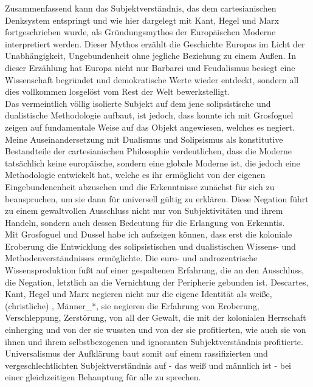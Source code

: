 Zusammenfassend kann das Subjektverständnis, das dem cartesianischen Denksystem
entspringt und wie hier dargelegt mit Kant, Hegel und Marx fortgeschrieben
wurde, als Gründungsmythos der Europäischen Moderne interpretiert werden. \footnotemark {} 
Dieser Mythos erzählt die Geschichte Europas im Licht der Unabhängigkeit,
Ungebundenheit ohne jegliche Beziehung zu einem Außen. In dieser Erzählung hat
Europa nicht nur Barbarei und Feudalismus besiegt eine Wissenschaft begründet
und demokratische Werte wieder entdeckt, sondern all dies vollkommen losgelöst
vom Rest der Welt bewerkstelligt.\footnotemark {}\\
 Das vermeintlich völlig isolierte Subjekt
auf dem jene solipsistische und dualistische Methodologie aufbaut, ist jedoch,
dass konnte ich mit Grosfoguel zeigen auf fundamentale Weise auf das Objekt
angewiesen, welches es negiert. Meine Auseinandersetzung mit Dualismus und
Solipsismus als konstitutive Bestandteile der cartesianischen Philosophie
verdeutlichen, dass die Moderne tatsächlich keine europäische, sondern eine
globale Moderne ist, die jedoch eine Methodologie entwickelt hat, welche es ihr
ermöglicht von der eigenen Eingebundenenheit abzusehen und die Erkenntnisse
zunächst für sich zu beanspruchen, um sie dann für universell gültig zu
erklären. Diese Negation führt zu einem gewaltvollen Ausschluss nicht nur von
Subjektivitäten und ihrem Handeln, sondern auch dessen Bedeutung für die
Erlangung von Erkenntis.
\\

Mit Grosfoguel und Dussel habe ich aufzeigen können, dass erst die koloniale
Eroberung die Entwicklung des solipsistischen und dualistischen Wissens- und
Methodenverständnisses ermöglichte. Die euro- und androzentrische
Wissensproduktion fußt auf einer gespaltenen Erfahrung, die an den Ausschluss,
die Negation, letztlich an die Vernichtung der Peripherie gebunden ist.
Descartes, Kant, Hegel und Marx negieren nicht nur die eigene Identität als
weiße, (christliche) \footnotemark {} , Männer\_*, sie
negieren die Erfahrung von Eroberung, Verschleppung, Zerstörung, von all der
Gewalt, die mit der kolonialen Herrschaft einherging und von der sie wussten
und von der sie profitierten, wie auch sie von ihnen und ihrem selbstbezogenen
und ignoranten Subjektverständnis profitierte. Universalismus der Aufklärung
baut somit auf einem rassifizierten und vergeschlechtlichten Subjektverständnis
auf - das weiß und männlich ist - bei einer gleichzeitigen Behauptung für alle
zu sprechen.
